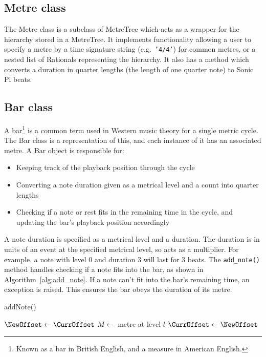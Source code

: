 \documentclass[12pt,twoside,openright]{report}
\begin{document}
\subsection{Metre class} \label{metre_class}

The Metre class is a subclass of MetreTree which acts as a wrapper for the
hierarchy stored in a MetreTree. It implements functionality allowing a user to
specify a metre by a time signature string (e.g.\ \texttt{'4/4'}) for common metres, or a
nested list of Rationals representing the hierarchy. It also has a method which
converts a duration in quarter lengths (the length of one quarter note) to Sonic
Pi beats.


\subsection{Bar class} \label{bar_class}

A bar\footnote{Known as a bar in British English, and a measure in American English.} is a common term used in Western music theory for a single
metric cycle. The Bar class is a representation of this, and each instance of it
has an associated metre. A Bar object is responsible for:
\begin{itemize}
	\item Keeping track of the playback position through the cycle
	\item Converting a note duration given as a metrical level and a count into
quarter lengths
	\item Checking if a note or rest fits in the remaining time in the cycle, and
updating the bar's playback position accordingly
\end{itemize}

A note duration is specified as a metrical level and a duration. The duration
is in units of an event at the specified metrical level, so acts as a multiplier.
For example, a note with level 0 and duration 3 will last for 3 beats. The
\verb'add_note()' method handles checking if a note fits into the bar, as shown in
Algorithm~\ref{alg:add_note}. If a note can't fit into the bar's remaining time,
an exception is raised. This ensures the bar obeys the duration of its metre.

\begin{algorithm}

    \caption{addNote()}
    \BlankLine

    $\NewOffset \gets \CurrOffset$\;
    $M \gets$ metre at level $l$\;
    $\CurrOffset \gets \NewOffset$\;
    \label{alg:add_note}
\end{algorithm}
\end{document}

